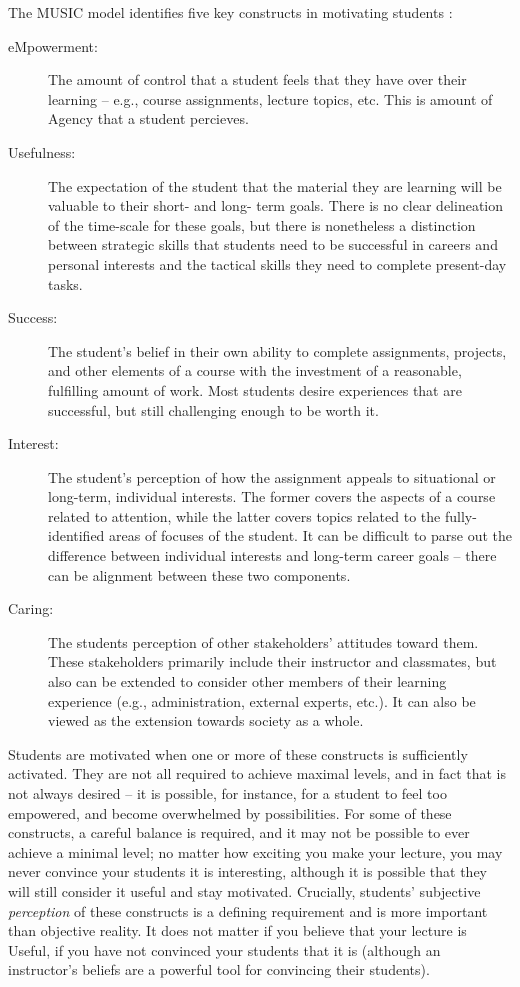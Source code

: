 The MUSIC model identifies five key constructs in motivating students \cite{jones-description}:
\begin{description}
	\item[eMpowerment:] The amount of control that a student feels that they have over their learning -- e.g., course assignments, lecture topics, etc. This is amount of Agency that a student percieves.
	\item[Usefulness:] The expectation of the student that the material they are learning will be valuable to their short- and long- term goals. There is no clear delineation of the time-scale for these goals, but there is nonetheless a distinction between strategic skills that students need to be successful in careers and personal interests and the tactical skills they need to complete present-day tasks.
	\item[Success:] The student's belief in their own ability to complete assignments, projects, and other elements of a course with the investment of a reasonable, fulfilling amount of work. Most students desire experiences that are successful, but still challenging enough to be worth it.
	\item[Interest:] The student's perception of how the assignment appeals to situational or long-term, individual interests. The former covers the aspects of a course related to attention, while the latter covers topics related to the fully-identified areas of focuses of the student. It can be difficult to parse out the difference between individual interests and long-term career goals -- there can be alignment between these two components.
	\item[Caring:] The students perception of other stakeholders' attitudes toward them. These stakeholders primarily include their instructor and classmates, but also can be extended to consider other members of their learning experience (e.g., administration, external experts, etc.). It can also be viewed as the extension towards society as a whole.
\end{description}

Students are motivated when one or more of these constructs is sufficiently activated.
They are not all required to achieve maximal levels, and in fact that is not always desired -- it is possible, for instance, for a student to feel too empowered, and become overwhelmed by possibilities.
For some of these constructs, a careful balance is required, and it may not be possible to ever achieve a minimal level; no matter how exciting you make your lecture, you may never convince your students it is interesting, although it is possible that they will still consider it useful and stay motivated.
Crucially, students' subjective \textit{perception} of these constructs is a defining requirement and is more important than objective reality.
It does not matter if you believe that your lecture is Useful, if you have not convinced your students that it is (although an instructor's beliefs are a powerful tool for convincing their students).

